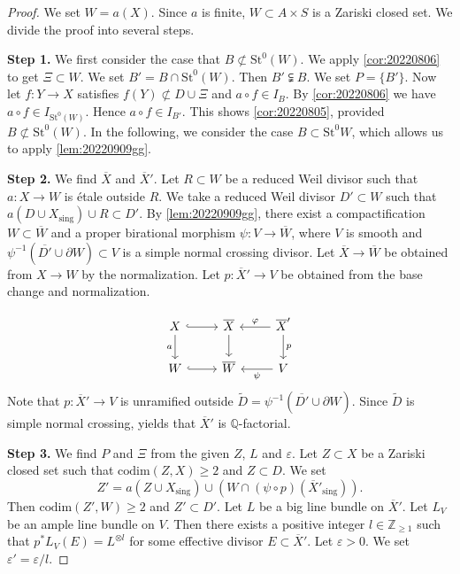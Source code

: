 \documentclass[11pt,english]{smfart}
\theoremstyle{plain}
\theoremstyle{definition}
\theoremstyle{remark}
\numberwithin{equation}{section}
\theoremstyle{plain}
\begin{document}
	\begin{proof}
	We set $W=a(X)$.
	Since $a$ is finite, $W\subset A\times S$ is a Zariski closed set.
	We divide the proof into several steps.
	
	
	\textbf{Step 1.}
	We first consider the case that $B\not\subset \mathrm{St}^0(W)$.
		We apply \cref{cor:20220806} to get $\Xi\subset W$.
		We set $B'=B\cap \mathrm{St}^0(W)$.
		Then $B'\subsetneqq B$.
		We set $P=\{ B'\}$.
		Now let $f:Y\to X$ satisfies $f(Y)\not\subset D\cup\Xi$ and $a\circ f\in I_B$.
		By \cref{cor:20220806} we have $a\circ f\in I_{\mathrm{St}^0(W)}$.
		Hence $a\circ f\in I_{B'}$.
		This shows \cref{cor:20220805}, provided $B\not\subset \mathrm{St}^0(W)$.
		In the following, we consider the case $B\subset \mathrm{St}^0W$, which allows us to apply \cref{lem:20220909gg}.
		
		\textbf{Step 2.}
		We find $\overline{X}$ and $\overline{X}'$.
		Let $R\subset W$ be a reduced Weil divisor such that $a:X\to W$ is {\'e}tale outside $R$.
		We take a reduced Weil divisor $D'\subset W$ such that $a(D\cup X_{\mathrm{sing}})\cup R\subset D'$.
		By \cref{lem:20220909gg},  there exist a compactification $W\subset \overline{W}$ and a proper birational morphism $\psi:V\to \overline{W}$, where $V$ is smooth and $\psi^{-1}(\overline{D'}\cup \partial W)\subset V$ is a simple normal crossing divisor.
		Let $\overline{X}\to \overline{W}$ be obtained from $X\to W$ by the normalization.
		Let $p:\overline{X}'\to V$ be obtained from the base change and normalization.
		
		
		
		\begin{equation*}
			\begin{tikzcd}
				X \arrow[r,hookrightarrow] \arrow[d, "a" ']	& \overline{X} \arrow[d]  &\overline{X}' \arrow[l,  "\varphi" ' ] \arrow[d, "p"] \\
				W\arrow[r,hookrightarrow]  & \overline{W}    &V \arrow[l, "\psi"] 
			\end{tikzcd}
		\end{equation*}
		Note that $p:\overline{X}'\to V$ is unramified outside $\widetilde{D}=\psi^{-1}(\overline{D'}\cup \partial W)$.
		Since $\widetilde{D}$ is simple normal crossing, \cite[Lemma 2]{NWY13} yields that $\overline{X}'$ is $\mathbb
		Q$-factorial.
		
		
		
		\textbf{Step 3.}
		We find $P$ and $\Xi$ from the given $Z$, $L$ and $\varepsilon$.
		Let $Z\subset X$ be a Zariski closed set such that $\mathrm{codim}(Z,X)\geq 2$ and $Z\subset D$. 	We set 
		$$Z'=a(Z\cup X_{\mathrm{sing}}
		)\cup (W\cap (\psi\circ p)(\overline{X}'_{\mathrm{sing}})).$$
		Then $\mathrm{codim}(Z',W)\geq 2$ and $Z'\subset D'$.
		Let $L$ be a big line bundle on $\overline{X}'$.
		Let $L_{V}$ be an ample line bundle on $V$.
		Then there exists a positive integer $l\in\mathbb Z_{\geq 1}$ such that $p^*L_{V}(E)=L^{\otimes l}$ for some effective divisor $E\subset \overline{X}'$.
		Let $\varepsilon>0$.
		We set $\varepsilon'=\varepsilon/l$.
		

\end{proof}
\end{document}
